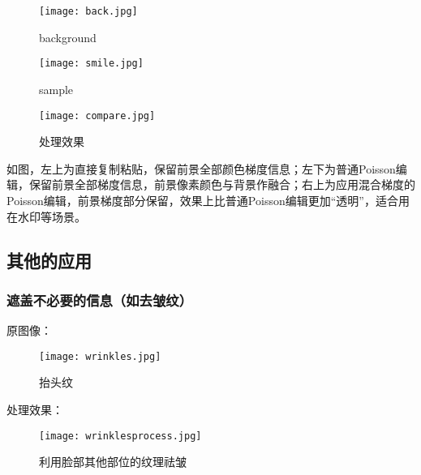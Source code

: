 \documentclass[14pt]{scrartcl} %
\begin{document}
\begin{figure}[h] %
	\begin{minipage}[t]{0.5\linewidth}
		\centering
		\texttt{[image: back.jpg]}
		\caption{background}
	\end{minipage}%
	\begin{minipage}[t]{0.5\linewidth}
		\centering
		\texttt{[image: smile.jpg]}
		\caption{sample}
	\end{minipage}
\end{figure}

\begin{figure}[h] %
	\centering
	\texttt{[image: compare.jpg]} %
	\caption{处理效果}
\end{figure}
如图，左上为直接复制粘贴，保留前景全部颜色梯度信息；左下为普通Poisson编辑，保留前景全部梯度信息，前景像素颜色与背景作融合；右上为应用混合梯度的Poisson编辑，前景梯度部分保留，效果上比普通Poisson编辑更加“透明”，适合用在水印等场景。

\pagebreak
\subsection{其他的应用}

\subsubsection{遮盖不必要的信息（如去皱纹）}

原图像：

\begin{figure}[h] %
	\centering
	\texttt{[image: wrinkles.jpg]} %
	\caption{抬头纹}
\end{figure}

处理效果：

\begin{figure}[h] %
	\centering
	\texttt{[image: wrinklesprocess.jpg]} %
	\caption{利用脸部其他部位的纹理祛皱}
\end{figure}

\pagebreak
\end{document}
